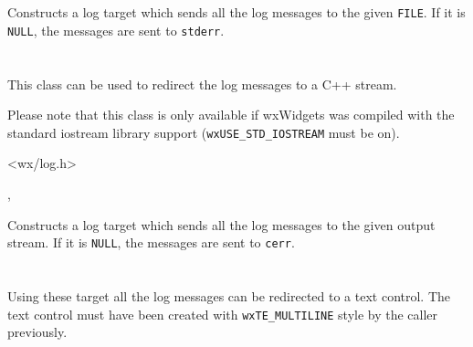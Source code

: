

\label{wxlogstderrctor}


Constructs a log target which sends all the log messages to the given
{\tt FILE}. If it is {\tt NULL}, the messages are sent to {\tt stderr}.


\section{}\label{wxlogstream}

This class can be used to redirect the log messages to a C++ stream.

Please note that this class is only available if wxWidgets was compiled with
the standard iostream library support ({\tt wxUSE\_STD\_IOSTREAM} must be on).




<wx/log.h>


,\\


\label{wxlogstreamctor}


Constructs a log target which sends all the log messages to the given
output stream. If it is {\tt NULL}, the messages are sent to {\tt cerr}.


\section{}\label{wxlogtextctrl}

Using these target all the log messages can be redirected to a text control.
The text control must have been created with {\tt wxTE\_MULTILINE} style by the
caller previously.

